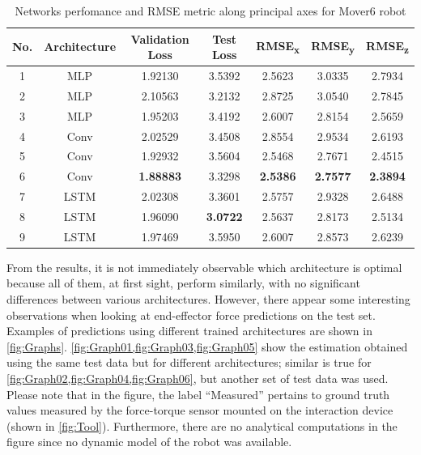\begin{table}
    \caption{Networks perfomance and RMSE metric along principal axes for Mover6 robot}
    \label{tab:ResultsMover}
    \centering
    \begin{tabular}{ccccccc}
        \toprule
        \textbf{No.} & \textbf{Architecture} & \textbf{Validation Loss} & \textbf{Test Loss} & \textbf{RMSE\textsubscript{x}} & \textbf{RMSE\textsubscript{y}} & \textbf{RMSE\textsubscript{z}} \\
        \midrule
        1 & MLP & 1.92130 & 3.5392 & 2.5623 & 3.0335 & 2.7934\\
        2 & MLP & 2.10563 & 3.2132 & 2.8725 & 3.0540 & 2.7845\\
        3 & MLP & 1.95203 & 3.4192 & 2.6007 & 2.8154 & 2.5659\\
        4 & Conv & 2.02529 & 3.4508 & 2.8554 & 2.9534 & 2.6193 \\
        5 & Conv & 1.92932 & 3.5604 & 2.5468 & 2.7671 & 2.4515\\
        6 & Conv & \textbf{1.88883} & 3.3298 & \textbf{2.5386} & \textbf{2.7577} & \textbf{2.3894} \\
        7 & LSTM & 2.02308 & 3.3601 & 2.5757 & 2.9328 & 2.6488 \\
        8 & LSTM & 1.96090 & \textbf{3.0722} & 2.5637 & 2.8173 & 2.5134\\
        9 & LSTM & 1.97469 & 3.5950 & 2.6007 & 2.8573 & 2.6239 \\
        \bottomrule
    \end{tabular}
\end{table}

From the results, it is not immediately observable which architecture is optimal because all of them, at first sight, perform similarly, with no significant differences between various architectures. However, there appear some interesting observations when looking at end-effector force predictions on the test set. Examples of predictions using different trained architectures are shown in \cref{fig:Graphs}. \cref{fig:Graph01,fig:Graph03,fig:Graph05} show the estimation obtained using the same test data but for different architectures; similar is true for \cref{fig:Graph02,fig:Graph04,fig:Graph06}, but another set of test data was used. Please note that in the figure, the label ``Measured'' pertains to ground truth values measured by the force-torque sensor mounted on the interaction device (shown in \cref{fig:Tool}). Furthermore, there are no analytical computations in the figure since no dynamic model of the robot was available.

